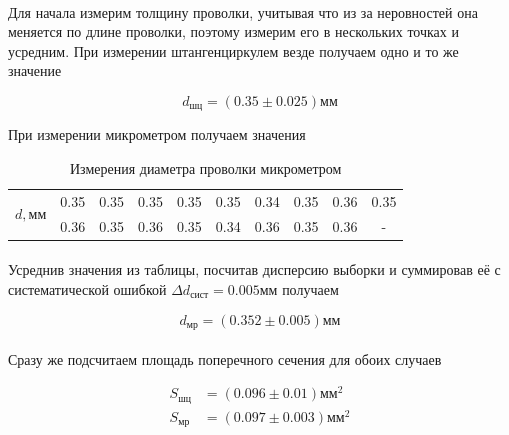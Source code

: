 \documentclass[a4paper, 12pt]{article}
\begin{document}
    \paragraph{}
    Для начала измерим толщину проволки, учитывая что из за неровностей она меняется по длине проволки, поэтому измерим его в нескольких точках и усредним.
    При измерении штангенциркулем везде получаем одно и то же значение

    \[d_{шц} = (0.35 \pm 0.025) мм\]

    \vspace{0.5cm}

    \begin{center}
        При измерении микрометром получаем значения
    \end{center}

    \begin{table}[H]
        \begin{center}

         \begin{tabular}{|c|c|c|c|c|c|c|c|c|c|}
            \hline
            \multirow{2}{*}{\textbf{$d, мм$}}
            & 0.35 & 0.35 & 0.35 & 0.35 & 0.35 & 0.34 & 0.35 & 0.36 & 0.35\\
            \cline{2-10}
            & 0.36 & 0.35 & 0.36 & 0.35 & 0.34 & 0.36 & 0.35 & 0.36 & - \\
            \hline
        \end{tabular}
            \caption{Измерения диаметра проволки микрометром}
        \end{center}

    \end{table}
    \paragraph{}
    Усреднив значения из таблицы, посчитав дисперсию выборки и суммировав её с систематической ошибкой $\Delta d_{сист} = 0.005мм$ получаем

    \[d_{мр} = (0.352 \pm 0.005)мм\]

    \paragraph{}
    Сразу же подсчитаем площадь поперечного сечения для обоих случаев

    \begin{align*}
        S_{шц} &= (0.096 \pm 0.01) мм^2 \\
        S_{мр} &= (0.097 \pm 0.003)мм^2
    \end{align*}
\end{document}
